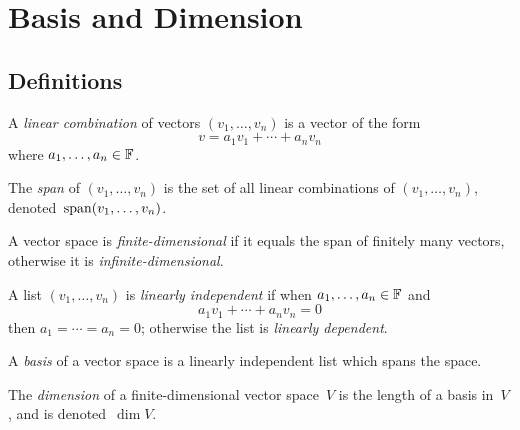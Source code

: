 %
%
%
\section{Basis and Dimension}
\subsection*{Definitions}
\begin{defn}
A \emph{linear combination} of vectors \((v_1,\ldots,v_n)\) is a vector of the form
\[v=a_1v_1+\cdots+a_nv_n\]
where \(a_1,\ldots,a_n\in\mathbb{F}\).
\end{defn}

\begin{defn}
The \emph{span} of \((v_1,\ldots,v_n)\) is the set of all linear combinations of \((v_1,\ldots,v_n)\), denoted~\(\operatorname{span}(v_1,\ldots,v_n)\).
\end{defn}

\begin{defn}
A vector space is \emph{finite-dimensional} if it equals the span of finitely many vectors, otherwise it is \emph{infinite-dimensional}.
\end{defn}

\begin{defn}
A list \((v_1,\ldots,v_n)\) is \emph{linearly independent} if when \(a_1,\ldots,a_n\in\mathbb{F}\) and
\[a_1v_1+\cdots+a_nv_n=0\]
then \(a_1=\cdots=a_n=0\); otherwise the list is \emph{linearly dependent}.
\end{defn}

\begin{defn}
A \emph{basis} of a vector space is a linearly independent list which spans the space.
\end{defn}

\begin{defn}
The \emph{dimension} of a finite-dimensional vector space~\(V\) is the length of a basis in~\(V\), and is denoted~\(\dim V\).
\end{defn}

